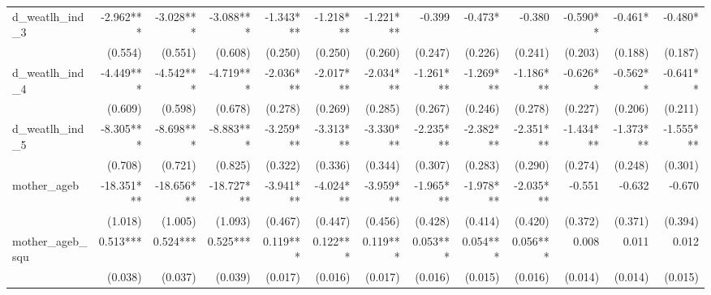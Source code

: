 \begin{tabular}{lrrrrrrrrrrrr}
d\_weatlh\_ind\_3                           &    -2.962*** &    -3.028*** &    -3.088*** &    -1.343*** &    -1.218*** &    -1.221*** &       -0.399 &      -0.473* &       -0.380 &     -0.590** &      -0.461* &      -0.480* \\ 
                                            &      (0.554) &      (0.551) &      (0.608) &      (0.250) &      (0.250) &      (0.260) &      (0.247) &      (0.226) &      (0.241) &      (0.203) &      (0.188) &      (0.187) \\ 
d\_weatlh\_ind\_4                           &    -4.449*** &    -4.542*** &    -4.719*** &    -2.036*** &    -2.017*** &    -2.034*** &    -1.261*** &    -1.269*** &    -1.186*** &     -0.626** &     -0.562** &     -0.641** \\ 
                                            &      (0.609) &      (0.598) &      (0.678) &      (0.278) &      (0.269) &      (0.285) &      (0.267) &      (0.246) &      (0.278) &      (0.227) &      (0.206) &      (0.211) \\ 
d\_weatlh\_ind\_5                           &    -8.305*** &    -8.698*** &    -8.883*** &    -3.259*** &    -3.313*** &    -3.330*** &    -2.235*** &    -2.382*** &    -2.351*** &    -1.434*** &    -1.373*** &    -1.555*** \\ 
                                            &      (0.708) &      (0.721) &      (0.825) &      (0.322) &      (0.336) &      (0.344) &      (0.307) &      (0.283) &      (0.290) &      (0.274) &      (0.248) &      (0.301) \\ 
mother\_ageb                                &   -18.351*** &   -18.656*** &   -18.727*** &    -3.941*** &    -4.024*** &    -3.959*** &    -1.965*** &    -1.978*** &    -2.035*** &       -0.551 &       -0.632 &       -0.670 \\ 
                                            &      (1.018) &      (1.005) &      (1.093) &      (0.467) &      (0.447) &      (0.456) &      (0.428) &      (0.414) &      (0.420) &      (0.372) &      (0.371) &      (0.394) \\ 
mother\_ageb\_squ                           &     0.513*** &     0.524*** &     0.525*** &     0.119*** &     0.122*** &     0.119*** &     0.053*** &     0.054*** &     0.056*** &        0.008 &        0.011 &        0.012 \\ 
                                            &      (0.038) &      (0.037) &      (0.039) &      (0.017) &      (0.016) &      (0.017) &      (0.016) &      (0.015) &      (0.016) &      (0.014) &      (0.014) &      (0.015) \\ 

\end{tabular}
